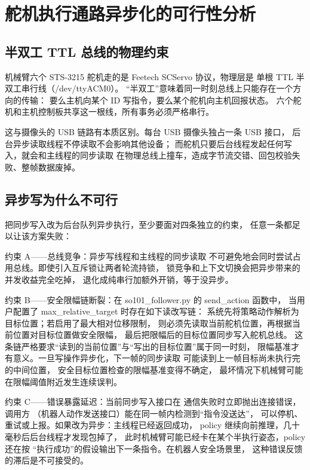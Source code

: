 \section{舵机执行通路异步化的可行性分析}\label{sec:async-write}

\subsection{半双工 TTL 总线的物理约束}\label{sec:async-write-bus}

机械臂六个 STS-3215 舵机走的是 Feetech SCServo 协议，物理层是
单根 TTL 半双工串行线（/dev/ttyACM0）。
“半双工”意味着同一时刻总线上只能存在一个方向的传输：
要么主机向某个 ID 写指令，要么某个舵机向主机回报状态。
六个舵机和主机控制板共享这一根线，所有事务必须严格串行。

这与摄像头的 USB 链路有本质区别。每台 USB 摄像头独占一条 USB 接口，
后台异步读取线程不停读取不会影响其他设备；
而舵机只要后台线程发起任何写入，就会和主线程的同步读取
在物理总线上撞车，造成字节流交错、回包校验失败、整帧数据废掉。

\subsection{异步写为什么不可行}\label{sec:async-write-why-not}

把同步写入改为后台队列异步执行，至少要面对四条独立的约束，
任意一条都足以让该方案失败：

约束 A——总线竞争：异步写线程和主线程的同步读取
不可避免地会同时尝试占用总线。即使引入互斥锁让两者轮流持锁，
锁竞争和上下文切换会把异步带来的并发收益完全吃掉，
退化成纯串行加额外开销，等于没异步。

约束 B——安全限幅链断裂：在
so101\_follower.py 的 send\_action 函数中，
当用户配置了 max\_relative\_target 时存在如下读改写链：
系统先将策略动作解析为目标位置；若启用了最大相对位移限制，
则必须先读取当前舵机位置，再根据当前位置对目标位置做安全限幅，
最后把限幅后的目标位置同步写入舵机总线。
这条链严格要求“读到的当前位置”与“写出的目标位置”属于同一时刻，
限幅基准才有意义。一旦写操作异步化，下一帧的同步读取
可能读到上一帧目标尚未执行完的中间位置，
安全目标位置检查的限幅基准变得不确定，
最坏情况下机械臂可能在限幅阈值附近发生连续误判。

约束 C——错误暴露延迟：当前同步写入接口在
通信失败时立即抛出连接错误，调用方
（机器人动作发送接口）能在同一帧内检测到“指令没送达”，
可以停机、重试或上报。如果改为异步：主线程已经返回成功，
policy 继续向前推理，几十毫秒后后台线程才发现包掉了，
此时机械臂可能已经卡在某个半执行姿态，policy 还在按
“执行成功”的假设输出下一条指令。在机器人安全场景里，
这种错误反馈的滞后是不可接受的。

